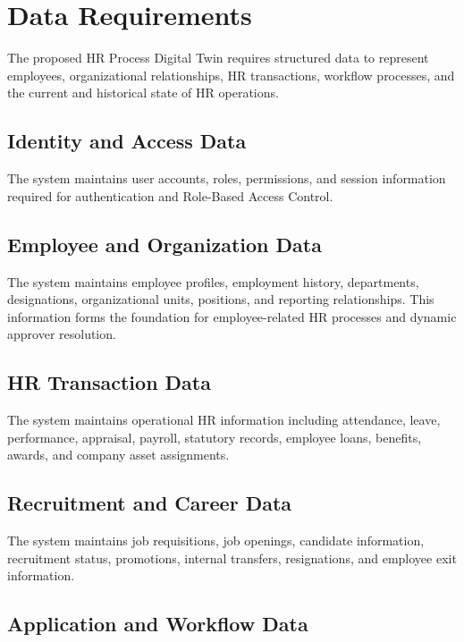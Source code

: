 \documentclass[12pt,a4paper]{article}
\begin{document}
\section{Data Requirements}

The proposed HR Process Digital Twin requires structured data to
represent employees, organizational relationships, HR transactions,
workflow processes, and the current and historical state of HR
operations.

\subsection{Identity and Access Data}

The system maintains user accounts, roles, permissions, and session
information required for authentication and Role-Based Access
Control.

\subsection{Employee and Organization Data}

The system maintains employee profiles, employment history,
departments, designations, organizational units, positions, and
reporting relationships. This information forms the foundation for
employee-related HR processes and dynamic approver resolution.

\subsection{HR Transaction Data}

The system maintains operational HR information including
attendance, leave, performance, appraisal, payroll, statutory
records, employee loans, benefits, awards, and company asset
assignments.

\subsection{Recruitment and Career Data}

The system maintains job requisitions, job openings, candidate
information, recruitment status, promotions, internal transfers,
resignations, and employee exit information.

\subsection{Application and Workflow Data}
\end{document}
